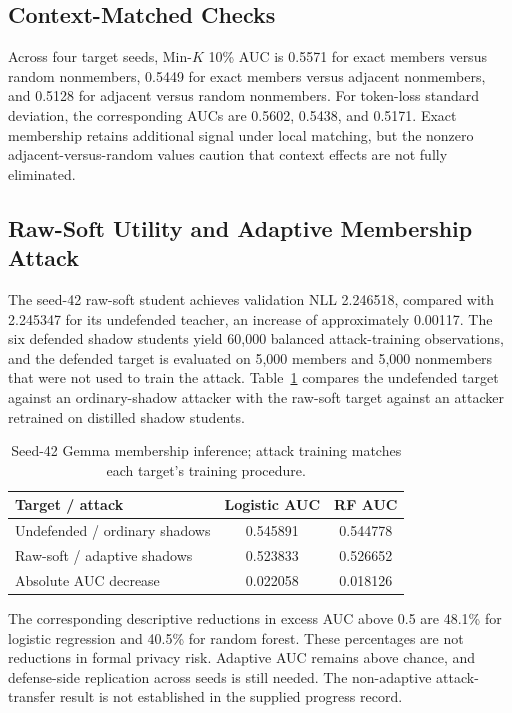 \documentclass[conference]{IEEEtran}
\begin{document}
\subsection{Context-Matched Checks}
Across four target seeds, Min-$K$ 10\% AUC is 0.5571 for exact members versus random nonmembers, 0.5449 for exact members versus adjacent nonmembers, and 0.5128 for adjacent versus random nonmembers. For token-loss standard deviation, the corresponding AUCs are 0.5602, 0.5438, and 0.5171. Exact membership retains additional signal under local matching, but the nonzero adjacent-versus-random values caution that context effects are not fully eliminated.

\subsection{Raw-Soft Utility and Adaptive Membership Attack}
The seed-42 raw-soft student achieves validation NLL 2.246518, compared with 2.245347 for its undefended teacher, an increase of approximately 0.00117. The six defended shadow students yield 60,000 balanced attack-training observations, and the defended target is evaluated on 5,000 members and 5,000 nonmembers that were not used to train the attack. Table~\ref{tab:gemma-defense} compares the undefended target against an ordinary-shadow attacker with the raw-soft target against an attacker retrained on distilled shadow students.
\begin{table}[htbp]
\centering
\caption{Seed-42 Gemma membership inference; attack training matches each target's training procedure.}
\label{tab:gemma-defense}
\begin{tabular}{lcc}
\hline
Target / attack & Logistic AUC & RF AUC \\
\hline
Undefended / ordinary shadows & 0.545891 & 0.544778 \\
Raw-soft / adaptive shadows & 0.523833 & 0.526652 \\
\hline
Absolute AUC decrease & 0.022058 & 0.018126 \\
\hline
\end{tabular}
\end{table}

The corresponding descriptive reductions in excess AUC above 0.5 are 48.1\% for logistic regression and 40.5\% for random forest. These percentages are not reductions in formal privacy risk. Adaptive AUC remains above chance, and defense-side replication across seeds is still needed. The non-adaptive attack-transfer result is not established in the supplied progress record.
\end{document}
